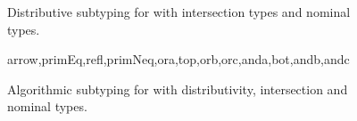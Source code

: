 \begin{figure}[t]
    \centering
    \begin{small}
    \end{small}
  \caption{Distributive subtyping for \name with intersection types and nominal types.}
  \label{fig:dist:dec:subtyping}
\end{figure}

\begin{comment}
\paragraph*{An example of distributive subtyping in Ceylon.}
We show the use of distributive subtyping with the following Ceylon code snippet:

\begin{lstlisting}[language=Scala]
void do(<Integer & String> | Boolean val) { /* do something */ }
\end{lstlisting}

\noindent
The function \emph{do} in above code snippet takes input value of type
\lstinline{$[[(Int/\ String) \/ Bool]]$}. However, we cannot pass a value of
type \lstinline{$[[(Int \/ Bool) /\ (String \/ Bool)]]$}
to the function \emph{do}: we get a type error if we try
to do that in a system with standard subtyping (without distributivity),
as standard subtyping fails to identify that the value has a subtype of the
expected argument type.

Distributive subtyping is more expressive than standard subtyping.
With distributivity of unions over intersections
(and vice-versa), the type \lstinline{$[[(Int \/ Bool) /\ (String \/ Bool)]]$} is a subtype
of \lstinline{$[[(Int /\ String) \/ Bool]]$} (in particular, by \rref{ds-distor}). As such
with distributive subtyping, the following Ceylon program type-checks:

\begin{lstlisting}[language=Scala]
variable <Integer | Boolean> & <String | Boolean> x = true; do(x);
\end{lstlisting}
\end{comment}


\begin{figure}[t]
    \centering
    \begin{small}
             {arrow,primEq,refl,primNeq,ora,top,orb,orc,anda,bot,andb,andc}
    \end{small}
    \caption{Algorithmic subtyping for \name with distributivity,
      intersection and nominal types.}
  \label{fig:dist:algo:subtyping}
\end{figure}

